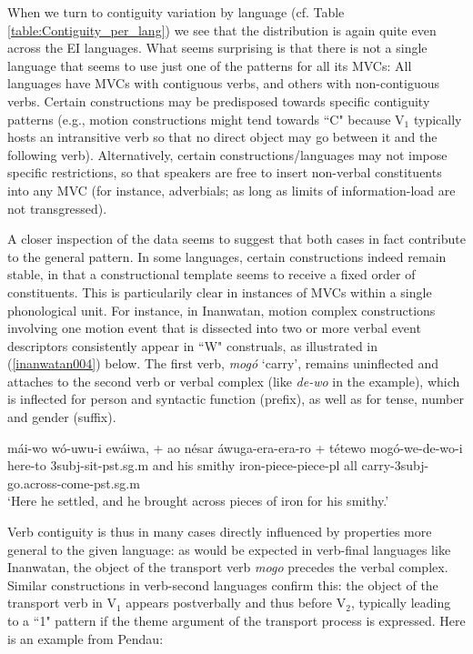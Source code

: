 When we turn to contiguity variation by language (cf. Table \ref{table:Contiguity_per_lang}) we see that the distribution is again quite even across the EI languages. What seems surprising is that there is not a single language that seems to use just one of the patterns for all its MVCs: All languages have MVCs with contiguous verbs, and others with non-contiguous verbs. Certain constructions may be predisposed towards specific contiguity patterns (e.g., motion constructions might tend towards ``C" because V$_1$ typically hosts an intransitive verb so that no direct object may go between it and the following verb). Alternatively, certain constructions/languages may not impose specific restrictions, so that speakers are free to insert non-verbal constituents into any MVC (for instance, adverbials; as long as limits of information-load are not transgressed). 

A closer inspection of the data seems to suggest that both cases in fact contribute to the general pattern. In some languages, certain constructions indeed remain stable, in that a constructional template seems to receive a fixed order of constituents. This is particularily clear in instances of MVCs within a single phonological unit. For instance, in Inanwatan, motion complex constructions involving one motion event that is dissected into two or more verbal event descriptors consistently appear in ``W" construals, as illustrated in (\ref{inanwatan004}) below. The first verb, \textit{mogó} `carry', remains uninflected and attaches to the second verb or verbal complex (like \textit{de-wo} in the example), which is inflected for person and syntactic function (prefix), as well as for tense, number and gender (suffix).

\ea \label{inanwatan004}
\gll mái-wo wó-uwu-i ewáiwa, + ao nésar áwuga-era-era-ro + tétewo mogó-we-de-wo-i \\
here-to 3\acs{subj}-sit-\acs{pst}.\acs{sg}.\acs{m} and his smithy iron-piece-piece-\acs{pl} all carry-3\acs{subj}-go.across-come-\acs{pst}.\acs{sg}.\acs{m} \\
\glft `Here he settled, and he brought across pieces of iron for his smithy.' \\ 
\z
\xe

Verb contiguity is thus in many cases directly influenced by properties more general to the given language: as would be expected in verb-final languages like Inanwatan, the object of the transport verb \textit{mogo} precedes the verbal complex. Similar constructions in verb-second languages confirm this: the object of the transport verb in V$_1$ appears postverbally and thus before V$_2$, typically leading to a ``1" pattern if the theme argument of the transport process is expressed. Here is an example from Pendau:


